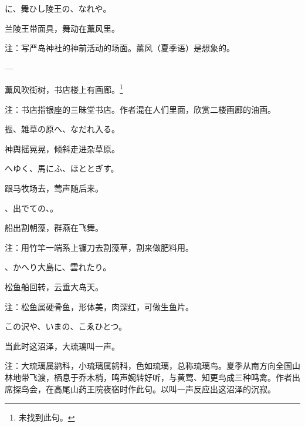 \begin{haiku}
    {\FH {}に、舞ひし陵王の、なれや。}

    {\FK 兰陵王带面具，舞动在薰风里。}

    {\FT 注：写严岛神社的神前活动的场面。薰风（夏季语）是想象的。}
\end{haiku}

\begin{haiku}
    {\FH ---}

    {\FK 薰风吹街树，书店楼上有画廊。\footnote{\FT 未找到此句。}}

    {\FT 注：书店指银座的三昧堂书店。作者混在人们里面，欣赏二楼画廊的油画。}
\end{haiku}

\begin{haiku}
    {\FH {}振、雑草の原へ、なだれ入る。}

    {\FK 神舆摇晃晃，倾斜走进杂草原。}
\end{haiku}

\begin{haiku}
    {\FH {}へゆく、馬にふ、ほととぎす。}

    {\FK 跟马牧场去，莺声随后来。}
\end{haiku}

\begin{haiku}
    {\FH {}、出でての、。}

    {\FK 船出割朝藻，群燕在飞舞。}

    {\FT 注：用竹竿一端系上镰刀去割藻草，割来做肥料用。}
\end{haiku}

\begin{haiku}
    {\FH {}、かへり大島に、雲れたり。}

    {\FK 松鱼船回转，云垂大岛天。}

    {\FT 注：松鱼属硬骨鱼，形体美，肉深红，可做生鱼片。}
\end{haiku}

\begin{haiku}
    {\FH この沢や、いまの、こゑひとつ。}

    {\FK 当此时这沼泽，大琉璃叫一声。}

    {\FT 注：大琉璃属鹟科，小琉璃属鸫科，色如琉璃，总称琉璃鸟。夏季从南方向全国山林地带飞渡，栖息于乔木梢，鸣声婉转好听，与黄莺、知更鸟成三种鸣禽。作者出席探鸟会，在高尾山药王院夜宿时作此句。以叫一声反应出这沼泽的沉寂。}
\end{haiku}

